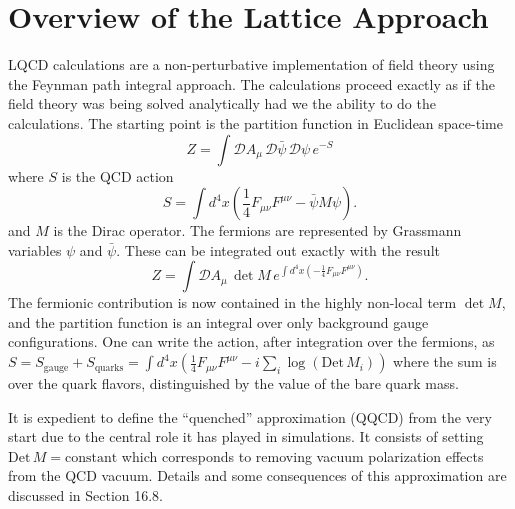 \chapter{Overview of the Lattice Approach}

LQCD calculations are a non-perturbative implementation of field theory
using the Feynman path integral approach. The calculations proceed exactly as if the field theory was being solved analytically had we the ability
to do the calculations. The starting point is the partition function in Euclidean space-time
\begin{equation}
  Z = \int \mathcal{D}A_\mu\, \mathcal{D}\bar{\psi}\, \mathcal{D}\psi\, e^{-S}
  \label{eq:partition}
\end{equation}
where $S$ is the QCD action
\begin{equation}
  S = \int d^4x \left( \frac{1}{4} F_{\mu\nu}F^{\mu\nu} - \bar{\psi} M \psi \right).
  \label{eq:qcd_action}
\end{equation}
and $M$ is the Dirac operator. The fermions are represented by Grassmann
variables $\psi$ and $\bar{\psi}$. These can be integrated out exactly with
the result
\begin{equation}
  Z = \int \mathcal{D}A_\mu\, \det M\, e^{\int d^4x \left(-\frac{1}{4} F_{\mu\nu}F^{\mu\nu}\right)}.
  \label{eq:partition_det}
\end{equation}
The fermionic contribution is now contained in the highly non-local term
$\det M$, and the partition function is an integral over only background
gauge configurations. One can write the action, after integration over the
fermions, as $S = S_\mathrm{gauge} + S_\mathrm{quarks} = \int d^4x ( \frac{1}{4} F_{\mu\nu}F^{\mu\nu} - i \sum_i \log(\mathrm{Det}\,M_i) )$
where the sum is over the quark flavors, distinguished by the value of the
bare quark mass.

It is expedient to define the ``quenched'' approximation (QQCD) from
the very start due to the central role it has played in simulations. It consists of setting $\mathrm{Det}\,M = \mathrm{constant}$ which corresponds to removing vacuum
polarization effects from the QCD vacuum. Details and some consequences
of this approximation are discussed in Section 16.8.

